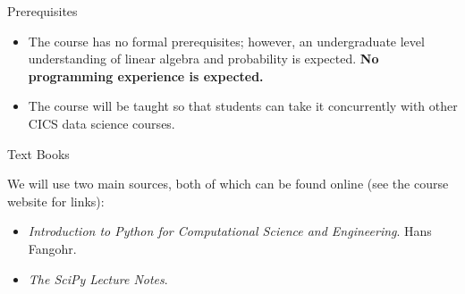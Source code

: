 \documentclass[serif,xcolor=pdftex,dvipsnames,table,hyperref={bookmarks=false,breaklinks}]{beamer}
\begin{document}
\begin{frame}[t]{Prerequisites}
\begin{itemize} [<+->]
\item The course has no formal prerequisites; however, an undergraduate level understanding of linear algebra and probability is expected. \textbf{No programming experience is expected.}
\item The course will be taught so that students can take it concurrently with other CICS data science courses.
\end{itemize}

\end{frame}

%
%
%

\begin{frame}[t,label=current]{Text Books}

We will use two main sources, both of which can be found online (see the course website for links):

\pause
\begin{itemize}[<+->]
\item \textit{Introduction to Python for Computational Science and Engineering}. Hans Fangohr.
\item \textit{The SciPy Lecture Notes}.
\end{itemize}


\end{frame}
\end{document}
